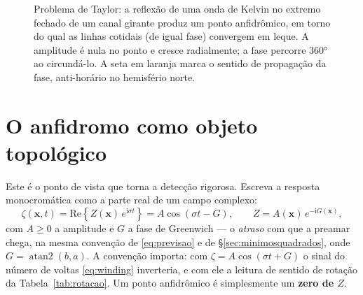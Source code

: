 \documentclass[11pt,a4paper,oneside]{report}
\theoremstyle{definition}
\theoremstyle{plain}
\theoremstyle{remark}
\newcommand{\vect}[1]{\bm{#1}}
\newcommand{\ii}{\mathrm{i}}
\DeclareMathOperator{\atantwo}{atan2}
\begin{document}
\begin{figure}[htbp]
\centering
{}
\caption{Problema de Taylor: a reflexão de uma onda de Kelvin no extremo
fechado de um canal girante produz um ponto anfidrômico, em torno do qual as
linhas cotidais (de igual fase) convergem em leque. A amplitude é nula no
ponto e cresce radialmente; a fase percorre \ang{360} ao circundá-lo. A seta
em laranja marca o sentido de propagação da fase, anti-horário no hemisfério
norte.}
\label{fig:taylor}
\end{figure}

\section{O anfidromo como objeto topológico}
\label{sec:topologia}

Este é o ponto de vista que torna a detecção rigorosa. Escreva a resposta
monocromática como a parte real de um campo complexo:
\begin{equation}
\zeta(\vect{x},t)=\mathrm{Re}\left\{Z(\vect{x})\,e^{\ii\sigma t}\right\}
=A\cos(\sigma t-G),
\qquad Z=A(\vect{x})\,e^{-\ii G(\vect{x})},
\label{eq:complexo}
\end{equation}
com $A\ge 0$ a amplitude e $G$ a fase de Greenwich — o \emph{atraso} com que a
preamar chega, na mesma convenção de \eqref{eq:previsao} e de
\S\ref{sec:minimosquadrados}, onde $G=\atantwo(b,a)$. A convenção importa: com
$\zeta=A\cos(\sigma t+G)$ o sinal do número de voltas \eqref{eq:winding}
inverteria, e com ele a leitura de sentido de rotação da
Tabela~\ref{tab:rotacao}. Um ponto anfidrômico é
simplesmente um \textbf{zero de $Z$}.
\end{document}
